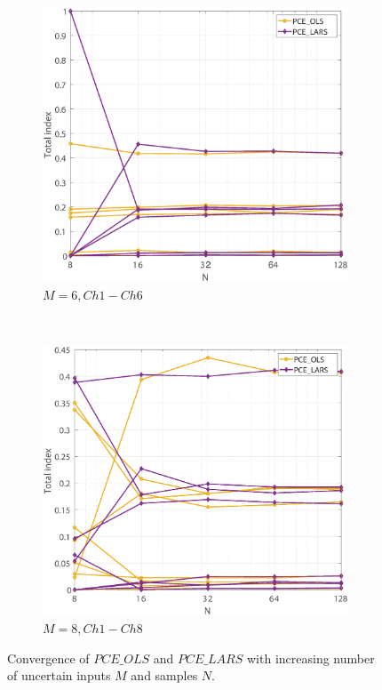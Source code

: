 \documentclass[review]{elsarticle}
\numberwithin{equation}{section}
\numberwithin{equation}{section}
\begin{document}
\begin{figure}[h!]
\begin{subfigure}[t]{0.32\textwidth}
        \includegraphics[trim={1cm 0cm 0 0cm},clip, scale=0.22]{convergence_chord1_6.eps}
        \caption{$M=6, Ch1-Ch6$}
    \end{subfigure}
      ~ 
    \begin{subfigure}[t]{0.32\textwidth}
        \centering
        \includegraphics[trim={1cm 0cm 0 0cm},clip, scale=0.22]{convergence_chord1_8.eps}
        \caption{ $M=8, Ch1-Ch8$}
 \end{subfigure}
    \caption{Convergence of $PCE\_OLS$ and $PCE\_LARS$ with increasing number of uncertain inputs $M$ and samples $N$.}
\label{convergence_dim}
\end{figure}
\end{document}
